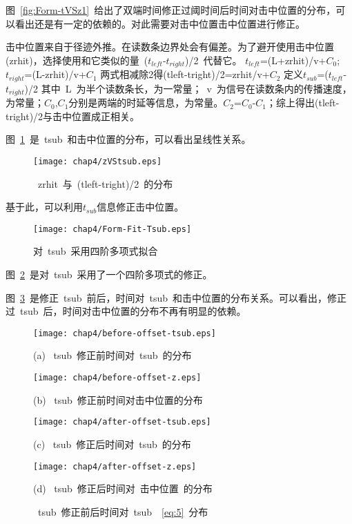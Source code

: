 图~\ref{fig:Form-tVSz1}~给出了双端时间修正过阈时间后时间对击中位置的分布，可以看出还是有一定的依赖的。对此需要对击中位置击中位置进行修正。

击中位置来自于径迹外推。在读数条边界处会有偏差。为了避开使用击中位置(zrhit)，选择使用和它类似的量~($t_{left}$-$t_{right}$)/2~代替它。
$t_{left}$=(L+zrhit)/v+$C_{0}$;
$t_{right}$=(L-zrhit)/v+$C_{1}$
两式相减除2得(tleft-tright)/2=zrhit/v+$C_{2}$
定义$t_{sub}$=($t_{left}$-$t_{right}$)/2
其中~L~为半个读数条长，为一常量；~v~为信号在读数条内的传播速度，为常量；$C_{0}$,$C_{1}$分别是两端的时延等信息，为常量。$C_{2}$=$C_{0}$-$C_{1}$；综上得出(tleft-tright)/2与击中位置成正相关。

图~\ref{fig:zVStsub}~是~tsub~和击中位置的分布，可以看出呈线性关系。
\begin{figure}[!h]
\centering
\texttt{[image: chap4/zVStsub.eps]}
\caption{~zrhit~与~(tleft-tright)/2~的分布}
\label{fig:zVStsub}
\end{figure}

基于此，可以利用$t_{sub}$信息修正击中位置。

\begin{figure}[!h]
\centering
\texttt{[image: chap4/Form-Fit-Tsub.eps]}
\caption{对~tsub~采用四阶多项式拟合}
\label{fig:Form-Fit-Tsub}
\end{figure}

图~\ref{fig:Form-Fit-Tsub}~是对~tsub~采用了一个四阶多项式的修正。

图~\ref{fig:Fit-Tsub}~是修正~tsub~前后，时间对~tsub~和击中位置的分布关系。可以看出，修正过~tsub~后，时间对击中位置的分布不再有明显的依赖。
\begin{figure}[!h]
\begin{minipage}{0.5\linewidth}
  \centerline{\texttt{[image: chap4/before-offset-tsub.eps]}}
  \centerline{(a) ~tsub~修正前时间对~tsub~的分布}
  \centerline{\label{fig:before-offset-tsub}}
\end{minipage}
\hfill
\begin{minipage}{0.5\linewidth}
  \centerline{\texttt{[image: chap4/before-offset-z.eps]}}
  \centerline{(b) ~tsub~修正前时间对击中位置的分布}
  \centerline{\label{fig:before-offset-z}}
\end{minipage}
\vfill
\begin{minipage}{0.5\linewidth}
  \centerline{\texttt{[image: chap4/after-offset-tsub.eps]}}
  \centerline{(c) ~tsub~修正后时间对~tsub~的分布}
  \centerline{\label{fig:after-offset-tsub}}
\end{minipage}
\hfill
\begin{minipage}{0.5\linewidth}
  \centerline{\texttt{[image: chap4/after-offset-z.eps]}}
  \centerline{(d) ~tsub~修正后时间对~击中位置~的分布}
  \centerline{\label{fig:after-offset-z}}
\end{minipage}
\caption{~tsub~修正前后时间对~tsub~~\ref{eq:5}~分布}
\label{fig:Fit-Tsub}
\end{figure}

